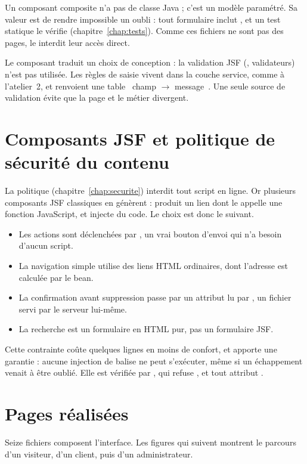 Un composant composite n'a pas de classe Java ; c'est un modèle paramétré. Sa valeur est de rendre impossible un oubli :
tout formulaire inclut , et un test statique le vérifie (chapitre~\ref{chap:tests}). Comme ces fichiers ne sont
pas des pages, le  interdit leur accès direct.

Le composant  traduit un choix de conception : la validation JSF (, validateurs) n'est pas
utilisée. Les règles de saisie vivent dans la couche service, comme à l'atelier~2, et renvoient une table
\guillemotleft~champ $\rightarrow$ message~\guillemotright{}. Une seule source de validation évite que la page et le métier divergent.

\section{Composants JSF et politique de sécurité du contenu}
La politique  (chapitre~\ref{chap:securite}) interdit tout script en ligne. Or plusieurs
composants JSF classiques en génèrent :  produit un lien dont le  appelle
une fonction JavaScript, et  injecte du code. Le choix est donc le suivant.

\begin{itemize}
  \item Les actions sont déclenchées par , un vrai bouton d'envoi qui n'a besoin d'aucun script.
  \item La navigation simple utilise des liens HTML ordinaires, dont l'adresse est calculée par le bean.
  \item La confirmation avant suppression passe par un attribut  lu par , un fichier
        servi par le serveur lui-même.
  \item La recherche est un formulaire  en HTML pur, pas un formulaire JSF.
\end{itemize}

Cette contrainte coûte quelques lignes en moins de confort, et apporte une garantie : aucune injection de balise
 ne peut s'exécuter, même si un échappement venait à être oublié. Elle est vérifiée par
, qui refuse ,  et tout attribut .

\section{Pages réalisées}
Seize fichiers  composent l'interface. Les figures qui suivent montrent le parcours d'un visiteur, d'un client,
puis d'un administrateur.

